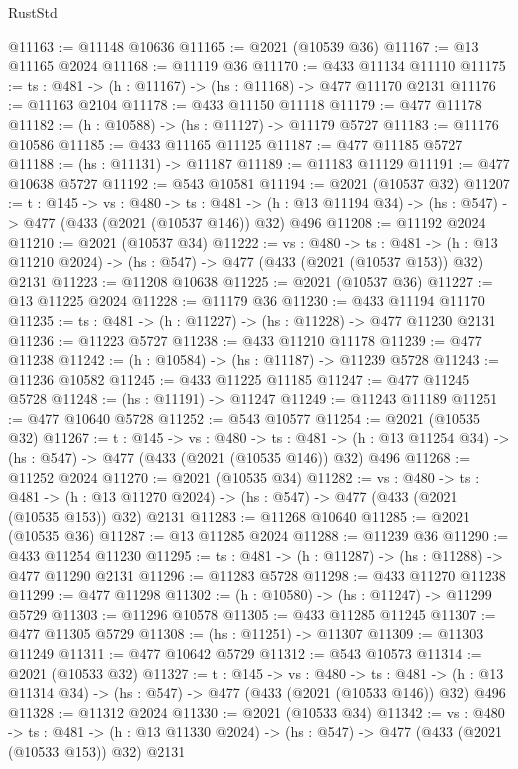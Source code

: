 \begin{lexlean}{RustStd}
\begin{coremodule}
{\begin{coremodule}
{{{{{{{{{{{{{{{{@11163 := @11148 @10636
@11165 := @2021 (@10539 @36)
@11167 := @13 @11165 @2024
@11168 := @11119 @36
@11170 := @433 @11134 @11110
@11175 := {ts : @481} -> (h : @11167) -> (hs : @11168) -> @477 @11170 @2131
@11176 := @11163 @2104
@11178 := @433 @11150 @11118
@11179 := @477 @11178
@11182 := (h : @10588) -> (hs : @11127) -> @11179 @5727
@11183 := @11176 @10586
@11185 := @433 @11165 @11125
@11187 := @477 @11185 @5727
@11188 := (hs : @11131) -> @11187
@11189 := @11183 @11129
@11191 := @477 @10638 @5727
@11192 := @543 @10581
@11194 := @2021 (@10537 @32)
@11207 := {t : @145} ->
  {vs : @480} ->
  {ts : @481} -> (h : @13 @11194 @34) -> (hs : @547) -> @477 (@433 (@2021 (@10537 @146)) @32) @496
@11208 := @11192 @2024
@11210 := @2021 (@10537 @34)
@11222 := {vs : @480} ->
  {ts : @481} ->
  (h : @13 @11210 @2024) -> (hs : @547) -> @477 (@433 (@2021 (@10537 @153)) @32) @2131
@11223 := @11208 @10638
@11225 := @2021 (@10537 @36)
@11227 := @13 @11225 @2024
@11228 := @11179 @36
@11230 := @433 @11194 @11170
@11235 := {ts : @481} -> (h : @11227) -> (hs : @11228) -> @477 @11230 @2131
@11236 := @11223 @5727
@11238 := @433 @11210 @11178
@11239 := @477 @11238
@11242 := (h : @10584) -> (hs : @11187) -> @11239 @5728
@11243 := @11236 @10582
@11245 := @433 @11225 @11185
@11247 := @477 @11245 @5728
@11248 := (hs : @11191) -> @11247
@11249 := @11243 @11189
@11251 := @477 @10640 @5728
@11252 := @543 @10577
@11254 := @2021 (@10535 @32)
@11267 := {t : @145} ->
  {vs : @480} ->
  {ts : @481} -> (h : @13 @11254 @34) -> (hs : @547) -> @477 (@433 (@2021 (@10535 @146)) @32) @496
@11268 := @11252 @2024
@11270 := @2021 (@10535 @34)
@11282 := {vs : @480} ->
  {ts : @481} ->
  (h : @13 @11270 @2024) -> (hs : @547) -> @477 (@433 (@2021 (@10535 @153)) @32) @2131
@11283 := @11268 @10640
@11285 := @2021 (@10535 @36)
@11287 := @13 @11285 @2024
@11288 := @11239 @36
@11290 := @433 @11254 @11230
@11295 := {ts : @481} -> (h : @11287) -> (hs : @11288) -> @477 @11290 @2131
@11296 := @11283 @5728
@11298 := @433 @11270 @11238
@11299 := @477 @11298
@11302 := (h : @10580) -> (hs : @11247) -> @11299 @5729
@11303 := @11296 @10578
@11305 := @433 @11285 @11245
@11307 := @477 @11305 @5729
@11308 := (hs : @11251) -> @11307
@11309 := @11303 @11249
@11311 := @477 @10642 @5729
@11312 := @543 @10573
@11314 := @2021 (@10533 @32)
@11327 := {t : @145} ->
  {vs : @480} ->
  {ts : @481} -> (h : @13 @11314 @34) -> (hs : @547) -> @477 (@433 (@2021 (@10533 @146)) @32) @496
@11328 := @11312 @2024
@11330 := @2021 (@10533 @34)
@11342 := {vs : @480} ->
  {ts : @481} ->
  (h : @13 @11330 @2024) -> (hs : @547) -> @477 (@433 (@2021 (@10533 @153)) @32) @2131
}}}}}}}}}}}}}}}}
\end{coremodule}}
\end{coremodule}
\end{lexlean}
